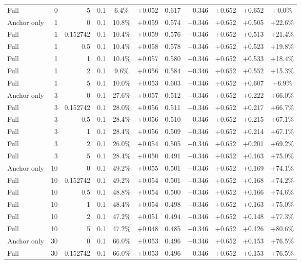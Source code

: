 \begin{table}[htbp]
\begin{tabular}{lrrrccccccc}
Full & 0 & 5 & 0.1 & 6.4\% & +0.052 & 0.617 & +0.346 & +0.652 & +0.652 & +0.0\% \\
Anchor only & 1 & 0 & 0.1 & 10.8\% & +0.059 & 0.574 & +0.346 & +0.652 & +0.505 & +22.6\% \\
Full & 1 & 0.152742 & 0.1 & 10.4\% & +0.059 & 0.576 & +0.346 & +0.652 & +0.513 & +21.4\% \\
Full & 1 & 0.5 & 0.1 & 10.4\% & +0.058 & 0.578 & +0.346 & +0.652 & +0.523 & +19.8\% \\
Full & 1 & 1 & 0.1 & 10.4\% & +0.057 & 0.580 & +0.346 & +0.652 & +0.533 & +18.4\% \\
Full & 1 & 2 & 0.1 & 9.6\% & +0.056 & 0.584 & +0.346 & +0.652 & +0.552 & +15.3\% \\
Full & 1 & 5 & 0.1 & 10.0\% & +0.053 & 0.603 & +0.346 & +0.652 & +0.607 & +6.9\% \\
Anchor only & 3 & 0 & 0.1 & 27.6\% & +0.057 & 0.512 & +0.346 & +0.652 & +0.222 & +66.0\% \\
Full & 3 & 0.152742 & 0.1 & 28.0\% & +0.056 & 0.511 & +0.346 & +0.652 & +0.217 & +66.7\% \\
Full & 3 & 0.5 & 0.1 & 28.4\% & +0.056 & 0.510 & +0.346 & +0.652 & +0.215 & +67.1\% \\
Full & 3 & 1 & 0.1 & 28.4\% & +0.056 & 0.509 & +0.346 & +0.652 & +0.214 & +67.1\% \\
Full & 3 & 2 & 0.1 & 26.0\% & +0.054 & 0.505 & +0.346 & +0.652 & +0.201 & +69.2\% \\
Full & 3 & 5 & 0.1 & 28.4\% & +0.050 & 0.491 & +0.346 & +0.652 & +0.163 & +75.0\% \\
Anchor only & 10 & 0 & 0.1 & 49.2\% & +0.055 & 0.501 & +0.346 & +0.652 & +0.169 & +74.1\% \\
Full & 10 & 0.152742 & 0.1 & 49.2\% & +0.054 & 0.501 & +0.346 & +0.652 & +0.168 & +74.2\% \\
Full & 10 & 0.5 & 0.1 & 48.8\% & +0.054 & 0.500 & +0.346 & +0.652 & +0.166 & +74.6\% \\
Full & 10 & 1 & 0.1 & 48.4\% & +0.054 & 0.498 & +0.346 & +0.652 & +0.163 & +75.0\% \\
Full & 10 & 2 & 0.1 & 47.2\% & +0.051 & 0.494 & +0.346 & +0.652 & +0.148 & +77.3\% \\
Full & 10 & 5 & 0.1 & 47.2\% & +0.048 & 0.485 & +0.346 & +0.652 & +0.126 & +80.6\% \\
Anchor only & 30 & 0 & 0.1 & 66.0\% & +0.053 & 0.496 & +0.346 & +0.652 & +0.153 & +76.5\% \\
Full & 30 & 0.152742 & 0.1 & 66.0\% & +0.053 & 0.496 & +0.346 & +0.652 & +0.153 & +76.5\% \\

\end{tabular}
\end{table}
